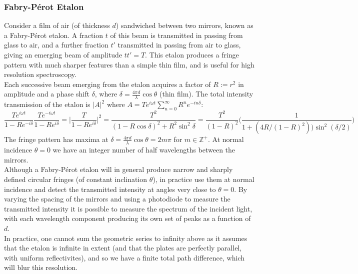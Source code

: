 \documentclass[a4paper]{article}
\begin{document}
\subsubsection*{Fabry-Pérot Etalon}
\begin{Note}
Consider a film of air (of thickness $d$) sandwiched between two mirrors, known as a Fabry-Pérot etalon. A fraction $t$ of this beam is transmitted in passing from glass to air, and a further fraction $t'$ transmitted in passing from air to glass, giving an emerging beam of amplitude $tt'=T$. This etalon produces a fringe pattern with much sharper features than a simple thin film, and is useful for high resolution spectroscopy. \\[5pt]
Each successive beam emerging from the etalon acquires a factor of $R:=r^2$ in amplitude and a phase shift $\delta$, where $\delta=\frac{4\pi d}{\lambda}\cos\theta$ (thin film). The total intensity transmission of the etalon is $|A|^2$ where $A=Te^{i\omega t}\sum_{n=0}^\infty R^ne^{-in\delta}$:
$$\frac{Te^{i\omega t}}{1-Re^{-i\delta}}\frac{Te^{-i\omega t}}{1-Re^{i\delta}}=\bigg|\frac{T}{1-Re^{i\delta}}\bigg|^2=\frac{T^2}{(1-R\cos\delta)^2+R^2\sin^2\delta}=\frac{T^2}{(1-R)^2}\bigg(\frac{1}{1+(4R/(1-R)^2))\sin^2(\delta/2)}\bigg)$$
The fringe pattern has maxima at $\delta=\frac{4\pi d}{\lambda}\cos\theta=2m\pi$ for $m\in\mathbb{Z}^+$. At normal incidence $\theta=0$ we have an integer number of half wavelengths between the mirrors.\\[5pt]
Although a Fabry-Pérot etalon will in general produce narrow and sharply defined circular fringes (of constant inclination $\theta$), in practice use them at normal incidence and detect the transmitted intensity at angles very close to $\theta=0$. By varying the spacing of the mirrors and using a photodiode to measure the transmitted intensity it is possible to measure the spectrum of the incident light, with each wavelength component producing its own set of peaks as a function of $d$.\\[5pt]
In practice, one cannot sum the geometric series to infinity above as it assumes that the etalon is infinite in extent (and that the plates are perfectly parallel, with uniform reflectivites), and so we have a finite total path difference, which will blur this resolution.
\end{Note}
\end{document}
